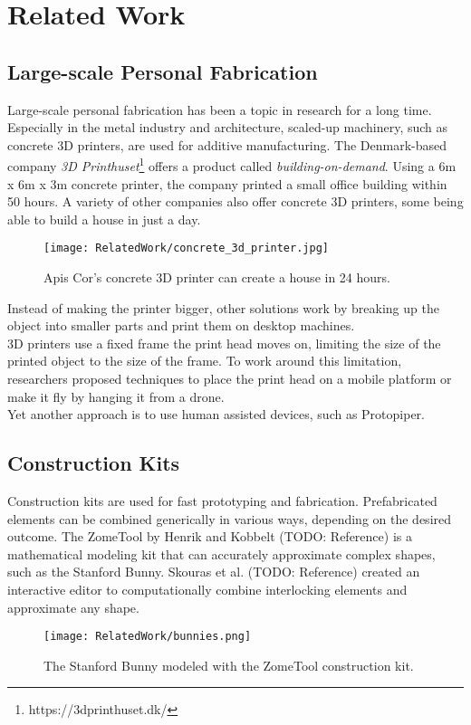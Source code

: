 \chapter{Related Work}\label{ch:relatedwork}
\section{Large-scale Personal Fabrication}
Large-scale personal fabrication has been a topic in research for a long time. Especially in the metal industry and architecture, scaled-up machinery, such as concrete 3D printers, are used for additive manufacturing. The Denmark-based company \textit{3D Printhuset}\footnote{https://3dprinthuset.dk/} offers a product called \textit{building-on-demand}. Using a 6m x 6m x 3m concrete printer, the company printed a small office building within 50 hours. A variety of other companies also offer concrete 3D printers, some being able to build a house in just a day.\\
\begin{figure}[h!]
    \texttt{[image: RelatedWork/concrete\_3d\_printer.jpg]}
    \centering
    \caption{Apis Cor’s concrete 3D printer can create a house in 24 hours.}
    \label{fig:concrete_3d_printer}
\end{figure}
Instead of making the printer bigger, other solutions work by breaking up the object into smaller parts and print them on desktop machines.\\
3D printers use a fixed frame the print head moves on, limiting the size of the printed object to the size of the frame. To work around this limitation, researchers proposed techniques to place the print head on a mobile platform or make it fly by hanging it from a drone.\\
Yet another approach is to use human assisted devices, such as Protopiper.

\section{Construction Kits}
Construction kits are used for fast prototyping and fabrication. Prefabricated elements can be combined generically in various ways, depending on the desired outcome. The ZomeTool by Henrik and Kobbelt (TODO: Reference) is a mathematical modeling kit that can accurately approximate complex shapes, such as the Stanford Bunny. Skouras et al. (TODO: Reference) created an interactive editor to computationally combine interlocking elements and approximate any shape.
\begin{figure}[h!]
    \texttt{[image: RelatedWork/bunnies.png]}
    \centering
    \caption{The Stanford Bunny modeled with the ZomeTool construction kit.}
    \label{fig:bunnies}
\end{figure}


